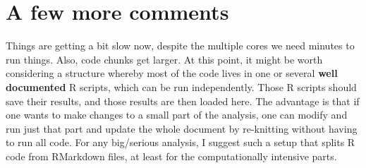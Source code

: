 \documentclass[]{article}
\begin{document}
\hypertarget{a-few-more-comments}{%
\section{A few more comments}\label{a-few-more-comments}}

Things are getting a bit slow now, despite the multiple cores we need
minutes to run things. Also, code chunks get larger. At this point, it
might be worth considering a structure whereby most of the code lives in
one or several \textbf{well documented} R scripts, which can be run
independently. Those R scripts should save their results, and those
results are then loaded here. The advantage is that if one wants to make
changes to a small part of the analysis, one can modify and run just
that part and update the whole document by re-knitting without having to
run all code. For any big/serious analysis, I suggest such a setup that
splits R code from RMarkdown files, at least for the computationally
intensive parts.
\end{document}
